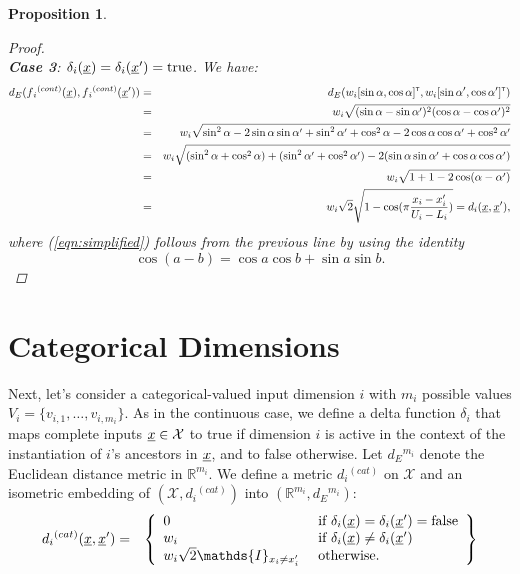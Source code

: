 \documentclass[letterpaper]{article}
\newcommand{\vect}[1]{\underline{\smash{#1}}}
\renewcommand{\v}[1]{\vect{#1}}
\newcommand{\reals}{\mathds{R}}
\newcommand{\sX}{\mathcal{X}}
\newcommand\transpose{{\textrm{\tiny{\sf{T}}}}}
\newtheorem{prop}[thm]{Proposition}
\newcommand{\indicator}{\ensuremath\mathds{I}}
\begin{document}
\begin{prop}
\begin{proof}
~\\\noindent{}\textbf{Case 3}: $\delta_i(\v{x}) = \delta_i(\v{x}') = \textrm{true}$. We have:
\begin{eqnarray}
\nonumber{}d_E(f{_i}^{(cont)}(\v{x}),f{_i}^{(cont)}(\v{x}')) & = & d_E(w_i [\sin{\alpha}, \cos{\alpha}]^\transpose, w_i [\sin{\alpha'}, \cos{\alpha'}]^\transpose)\\ 
\nonumber{}& = & w_i \sqrt{(\sin{\alpha}-\sin{\alpha'})^2 (\cos{\alpha}-\cos{\alpha'})^2}\\
\nonumber{}& = & w_i \sqrt{\sin^2{\alpha} -2 \sin{\alpha}\sin{\alpha'} + \sin^2{\alpha'}  + \cos^2{\alpha} -2 \cos{\alpha}\cos{\alpha'} + \cos^2{\alpha'} }\\
\nonumber{}& = & w_i \sqrt{(\sin^2{\alpha}+\cos^2{\alpha})   +  (\sin^2{\alpha'}+\cos^2{\alpha'})   -2 (\sin{\alpha}\sin{\alpha'} + \cos{\alpha}\cos{\alpha'})}\\
\label{eqn:simplified}& = & w_i \sqrt{ 1+1-2 \cos(\alpha-\alpha')}\\
\nonumber{}& = & w_i \sqrt{2} \sqrt{1 - \cos(\pi \frac{x_i-x_i'}{U_i-L_i})} = d_i(\v{x}, \v{x}'),
\end{eqnarray}
where (\ref{eqn:simplified}) follows from the previous line by using the identity 
\[\cos{(a-b)} = \cos{a}\cos{b} + \sin{a}\sin{b}.\]
\end{proof}
\end{prop}






\section{Categorical Dimensions}

Next, let's consider a categorical-valued input dimension $i$ with $m_i$ possible values $V_i = \{v_{i,1}, \dots, v_{i,m_i}\}$. As in the continuous case, we define a delta function $\delta_i$ that maps complete inputs $\v{x} \in \sX$ to true if dimension $i$ is active in the context of the instantiation of $i$'s ancestors in $\v{x}$, and to false otherwise. Let $d{_E}^{m_i}$ denote the Euclidean distance metric in $\reals^{m_i}$. We define a metric $d{_i}^{(cat)}$ on $\sX$ and an isometric embedding of $(\sX, d{_i}^{(cat)})$ into $(\reals^{m_i},d{_E}^{m_i})$:
\begin{eqnarray}
\nonumber{}d{_i}^{(cat)}(\v{x}, \v{x}') & = & \left\{\begin{array}{ll}
\nonumber{} 0 & \textrm{ if } \delta_i(\v{x}) = \delta_i(\v{x}') = \textrm{false}\\
\nonumber{} w_i & \textrm{ if } \delta_i(\v{x}) \neq \delta_i(\v{x}')\\
\nonumber{} w_i \sqrt{2} \indicator_{x_i \neq x_i'} & \textrm{ otherwise. }\end{array}\right\}
\end{eqnarray}
\end{document}
